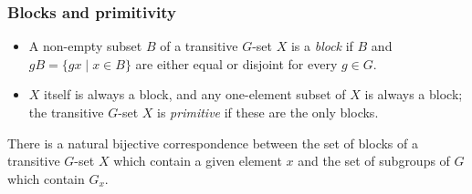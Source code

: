 \documentclass[../Odyssey_Project.tex]{subfiles}
\begin{document}
\subsubsection*{Blocks and primitivity}
\begin{itemize}
    \item A non-empty subset $B$ of a transitive $G$-set $X$ is a \emph{block} if $B$ and $gB = \{gx \mid x \in B\}$ are either equal or disjoint for every $g \in G$.
    \item $X$ itself is always a block, and any one-element subset of $X$ is always a block; the transitive $G$-set $X$ is \emph{primitive} if these are the only blocks.
\end{itemize}

\begin{proposition}
\label{prop:3.9}
There is a natural bijective correspondence between the set of blocks of a transitive $G$-set $X$ which contain a given element $x$ and the set of subgroups of $G$ which contain $G_x$.
\end{proposition}
\end{document}
